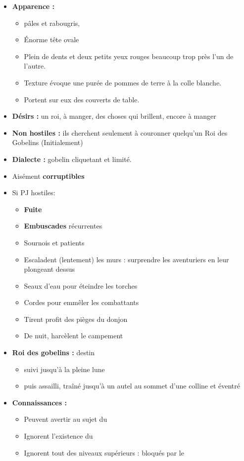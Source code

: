 \begin{itemize}
  \item \textbf{Apparence :}
  \begin{itemize}
    \item pâles et rabougris,
    \item \'Enorme tête ovale
    \item Plein de dents et deux petits yeux rouges beaucoup trop près l'un de l'autre.
    \item Texture évoque une purée de pommes de terre à la colle blanche.
    \item Portent sur eux des couverts de  table.
  \end{itemize}
  \item \textbf{ Désirs :} un roi, à manger, des choses qui brillent, encore à manger
  \item \textbf{Non hostiles :} ils cherchent seulement à couronner quelqu'un Roi des Gobelins (Initialement)
  \item \textbf{Dialecte :} gobelin cliquetant et limité.
  \item Aisément \textbf{corruptibles}
  \item Si PJ hostiles:
  \begin{itemize}
    \item \textbf{Fuite}
    \item \textbf{Embuscades} récurrentes
    \item Sournois et patients
    \item Escaladent (lentement) les murs : surprendre les aventuriers en leur plongeant dessus
    \item Seaux d'eau pour éteindre les torches
    \item Cordes pour emmêler les combattants
    \item Tirent profit des pièges du donjon
    \item De nuit, harcèlent le campement
  \end{itemize}
  \item \textbf{Roi des gobelins :} destin
  \begin{itemize}
    \item suivi jusqu'à la pleine lune
    \item puis assailli, traîné jusqu'à un autel au sommet d'une colline et éventré
  \end{itemize}
  \item \textbf{Connaissances :}
  \begin{itemize}
    \item Peuvent avertir au sujet du \textbf{}
    \item Ignorent l'existence du \textbf{}
    \item Ignorent tout des niveaux supérieurs : bloqués par le \textbf{}
  \end{itemize}
\end{itemize}

